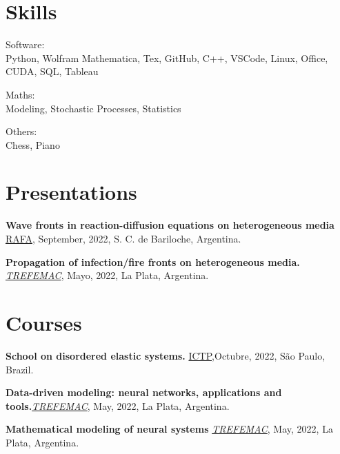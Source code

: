 \documentclass[a4paper,10pt]{article}
\begin{document}
\begin{adjustbox}{valign=t}
\begin{minipage}{0.5\textwidth}
\begin{description}
\end{description}

\vspace*{-.7cm}
\section*{Skills}
\begin{description}
    \item \textcolor{ColorOne}{Software:}\\ Python, Wolfram Mathematica, Tex, GitHub, C++, VSCode, Linux, Office, CUDA, SQL, Tableau \vspace*{-.3cm}
    \item \textcolor{ColorOne}{Maths:}\\ Modeling, Stochastic Processes, Statistics \vspace*{-.3cm}
    \item \textcolor{ColorOne}{Others:}\\ Chess, Piano
\end{description}



\vspace*{-.7cm}
\section*{Presentations}
\begin{description}
	\raggedright
    \item [-] \textbf{Wave fronts in reaction-diffusion equations on heterogeneous media} \href{https://rafa2022.fisica.org.ar/}{RAFA}, September, 2022, S. C. de Bariloche, Argentina.
	\item [-] \textbf{Propagation of infection/fire fronts on heterogeneous media.} {\href{https://sites.google.com/view/trefemac2022}{\it TREFEMAC}}, Mayo, 2022, La Plata, Argentina.

\end{description}
\vspace*{-.7cm}
\section*{Courses}
\begin{description}
    \raggedright
    \item [-] \textbf{School on disordered elastic systems.} \href{https://www.ictp-saifr.org/des2022/}{ICTP},Octubre, 2022, S\~ao Paulo, Brazil.
    \item [-] \textbf{Data-driven modeling: neural networks, applications and tools.}{\href{https://sites.google.com/view/trefemac2022}{\it TREFEMAC}}, May, 2022, La Plata, Argentina.
    \item [-] \textbf{Mathematical modeling of neural systems} {\href{https://sites.google.com/view/trefemac2022}{\it TREFEMAC}}, May, 2022, La Plata, Argentina.
\end{description}


\end{minipage}
\end{adjustbox}
\end{document}
